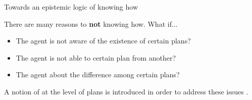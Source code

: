 \documentclass{beamer}
\begin{document}
\begin{frame}{Towards an epistemic logic of knowing how}
    \begin{small}
    There are many reasons to {\bf not} knowing how. What if...
    \begin{itemize}
    
    \item The agent is not aware of the existence of certain plans? \pause
    
    
     \item The agent is not able to  certain plan from another?\pause
    
     \item The agent  about the difference among certain plans? \pause
    \end{itemize}
    
    A notion of  at the level of plans is introduced in order to address these issues .
    \end{small}  %
    
    
    
    
    \end{frame}


        
        
        
        
        
        
        
\end{document}
